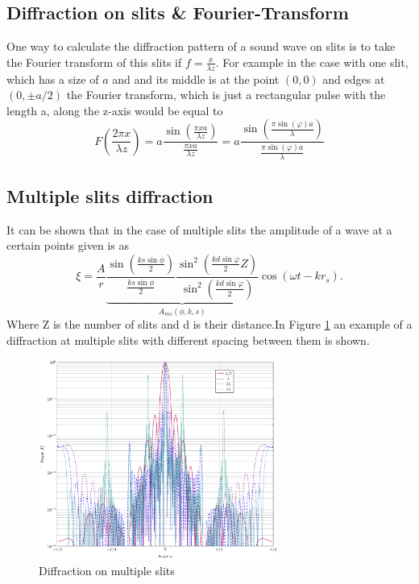 \subsection{Diffraction on slits \& Fourier-Transform}\label{2_Acoustics_sec:diffraction_fourier}
One way to calculate the diffraction pattern of a sound wave on slits is to take the Fourier transform of this slits if $f = \frac{x}{\lambda z}$. For example in the case with one slit, which has a size of $a$ and and its middle is at the point $(0,0)$ and edges at $(0,\pm a/2)$ the Fourier transform, which is just a rectangular pulse with the length a, along the z-axis would be equal to
\begin{equation}
    F\left ( \frac{2\pi x}{\lambda z} \right ) = a\frac{\sin{\left(  \frac{\pi x a}{\lambda z} \right )}}{\frac{\pi x a}{\lambda z}} = a\frac{\sin{\left(  \frac{\pi \sin{(\varphi)} a}{\lambda} \right )}}{\frac{\pi \sin{(\varphi)} a}{\lambda}}
\end{equation}
\subsection{Multiple slits diffraction}
It can be shown that in the case of multiple slits the amplitude of a wave at a certain points given is as
\begin{equation}
    \xi = \frac{A}{r} \underbrace{\frac{\sin \left ( \frac{ks \sin \phi}{2}\right )}{ \frac{ks \sin \phi}{2}} \frac{\sin^2\left( \frac{k d \sin{\varphi}}{2}Z\right )}{\sin^2\left( \frac{k d \sin{\varphi}}{2}\right )}}_{A_{ms}(\phi,k,s)} \cos \left ( \omega t - k r_s\right ).
\end{equation}
Where Z is the number of slits and d is their distance.In Figure \ref{6_fig:multiple_diffraction} an example of a diffraction at multiple slits with different spacing between them is shown.
\begin{figure}
    \centering
    \includegraphics[width=0.7\textwidth]{images/2_Preliminaries/Multiple_Slid_Count.pdf}
    \caption{Diffraction on multiple slits}
    \label{6_fig:multiple_diffraction}
\end{figure}
